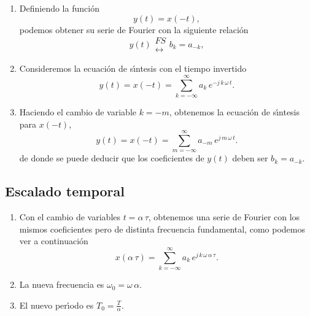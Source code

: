 \begin{enumerate}

\item Definiendo la funci\'{o}n 
\begin{equation}
y\left( t\right) =x\left( -t\right) ,
\end{equation}
podemos obtener su serie de Fourier con la siguiente relaci\'{o}n
\begin{equation}
y\left( t\right) 
\begin{array}{l}
FS \\ 
\longleftrightarrow
\end{array}
b_{k}=a_{-k},
\end{equation}

\item Consideremos la ecuaci\'{o}n de s\'{\i}ntesis con el tiempo
  invertido
\begin{equation}
y(t) = x\left( -t\right) =
\sum_{k=-\infty }^{\infty }a_{k} \, e^{-j \, k \, \omega \, t}.
\end{equation}

\item Haciendo el cambio de variable $k = -m$, obtenemos la
  ecuaci\'{o}n de s\'{\i}ntesis para $x(-t)$, 
\begin{equation}
y(t) = x\left( -t\right) =
\sum_{m=-\infty }^{\infty }a_{-m} \, e^{j \, m \, \omega \, t}.
\end{equation}
de donde se puede deducir que los coeficientes de $y(t)$ deben ser $b_{k} = a_{-k}$.

\end{enumerate}

\subsection{Escalado temporal}

\begin{enumerate}
\item Con el cambio de variables $t = \alpha \, \tau$, obtenemos una serie de
Fourier con los mismos coeficientes pero de distinta frecuencia
fundamental, como podemos ver a continuaci\'{o}n
\begin{equation}
x\left( \alpha  \, \tau \right) =
\sum_{k=-\infty }^{\infty}a_{k} \, e^{j \, k \, \omega \, \alpha \, \tau}.
\end{equation}

\item La nueva frecuencia es $\omega_{0} = \omega \, \alpha$.

\item El nuevo per\'{\i}odo es $T_{0} = \frac{T}{\alpha}$.
\end{enumerate}

